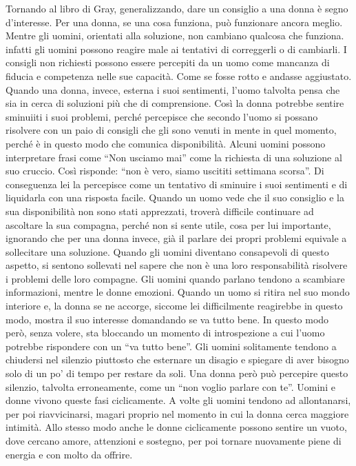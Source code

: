 \documentclass[12pt]{book} %
\begin{document}
Tornando al libro di Gray, generalizzando, dare un consiglio a una donna è segno d'interesse. Per una donna, se una cosa funziona, può
funzionare ancora meglio. Mentre gli uomini, orientati alla soluzione, non cambiano qualcosa che funziona. infatti gli
uomini possono reagire male ai tentativi di correggerli o di cambiarli. I consigli non richiesti possono essere percepiti da
un uomo come mancanza di fiducia e competenza nelle sue capacità. Come se fosse rotto e andasse aggiustato. Quando una
donna, invece, esterna i suoi sentimenti, l'uomo talvolta pensa che sia in cerca di soluzioni più che di
comprensione. Così la donna potrebbe sentire sminuiiti i suoi problemi, perché percepisce che secondo l'uomo
si possano risolvere con un paio di consigli che gli sono venuti in mente in quel momento, perché è in questo modo
che comunica disponibilità. Alcuni uomini possono interpretare frasi come “Non usciamo mai” come la richiesta di una soluzione al suo cruccio. 
Così risponde: “non è vero, siamo uscititi settimana scorsa”. Di conseguenza lei la percepisce come un tentativo di sminuire i suoi sentimenti e di
liquidarla con una risposta facile. Quando un uomo vede che il suo consiglio e la sua disponibilità non sono stati
apprezzati, troverà difficile continuare ad ascoltare la sua compagna, perché non si sente utile, cosa per lui
importante, ignorando che per una donna invece, già il parlare dei propri problemi equivale a sollecitare una soluzione.
Quando gli uomini diventano consapevoli di questo aspetto, si sentono sollevati nel sapere che non è una loro
responsabilità risolvere i problemi delle loro compagne. Gli uomini quando parlano tendono a scambiare informazioni,
mentre le donne emozioni. Quando un uomo si ritira nel suo mondo interiore e, la donna se ne accorge,
siccome lei difficilmente reagirebbe in questo modo, mostra il suo interesse domandando se va tutto bene. In questo modo però, senza volere, sta bloccando un momento di introspezione a cui l'uomo potrebbe rispondere con un “va tutto bene”. Gli uomini solitamente tendono a chiudersi nel silenzio piuttosto che esternare un disagio e spiegare di aver bisogno solo di un po' di tempo per restare da soli. Una donna però può percepire questo silenzio, talvolta erroneamente, come un “non voglio parlare con te”. Uomini e donne vivono queste fasi ciclicamente. A volte gli uomini tendono ad
allontanarsi, per poi riavvicinarsi, magari proprio nel momento in cui la donna cerca maggiore intimità. Allo stesso
modo anche le donne ciclicamente possono sentire un vuoto, dove cercano amore, attenzioni e sostegno, per poi tornare nuovamente piene di energia e con molto da offrire. 
\end{document}
